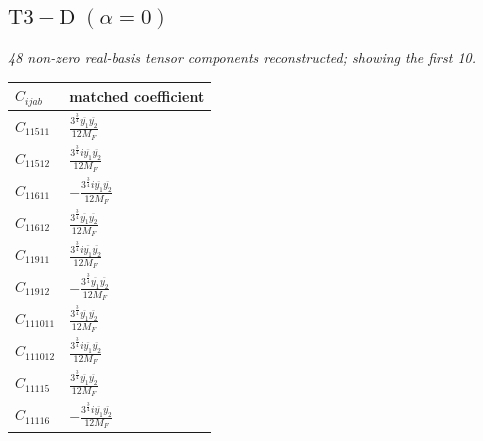 \documentclass[9pt]{article}
\begin{document}
\subsection*{$ \mathrm{T3-D}\;(\alpha=0) $}
\textit{48 non-zero real-basis tensor components reconstructed; showing the first 10.}
\begin{longtable}{@{}ll@{}}
\toprule
$C_{ijab}$ & matched coefficient \\
\midrule
$C_{11511}$ & $ \frac{3^{\frac{3}{4}} \overline{y_{1}} \overline{y_{2}}}{12 M_F} $ \\
$C_{11512}$ & $ \frac{3^{\frac{3}{4}} i \overline{y_{1}} \overline{y_{2}}}{12 M_F} $ \\
$C_{11611}$ & $ - \frac{3^{\frac{3}{4}} i \overline{y_{1}} \overline{y_{2}}}{12 M_F} $ \\
$C_{11612}$ & $ \frac{3^{\frac{3}{4}} \overline{y_{1}} \overline{y_{2}}}{12 M_F} $ \\
$C_{11911}$ & $ \frac{3^{\frac{3}{4}} i \overline{y_{1}} \overline{y_{2}}}{12 M_F} $ \\
$C_{11912}$ & $ - \frac{3^{\frac{3}{4}} \overline{y_{1}} \overline{y_{2}}}{12 M_F} $ \\
$C_{111011}$ & $ \frac{3^{\frac{3}{4}} \overline{y_{1}} \overline{y_{2}}}{12 M_F} $ \\
$C_{111012}$ & $ \frac{3^{\frac{3}{4}} i \overline{y_{1}} \overline{y_{2}}}{12 M_F} $ \\
$C_{11115}$ & $ \frac{3^{\frac{3}{4}} \overline{y_{1}} \overline{y_{2}}}{12 M_F} $ \\
$C_{11116}$ & $ - \frac{3^{\frac{3}{4}} i \overline{y_{1}} \overline{y_{2}}}{12 M_F} $ \\
\bottomrule
\end{longtable}
\end{document}
